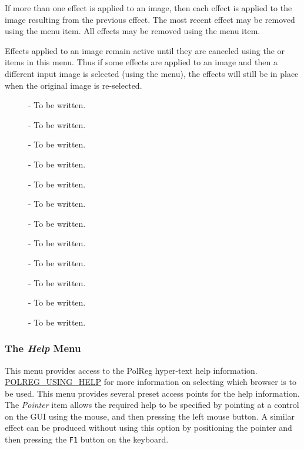 If more than one effect is applied to an image, then each effect is
applied to the image resulting from the previous effect. The most recent
effect may be removed using the 
menu item. All effects may be removed using the  menu item.

Effects applied to an image remain active until they are canceled using
the  or
 items in this menu. Thus
if some effects are applied to an image and then a different input image 
is selected (using the  menu), 
the effects will still be in place when the original image is re-selected.

\begin{description}

\item [ ] - To be written.
\item [ ] - To be written.
\item [ ] - To be written.
\item [ ] - To be written.
\item [ ] - To be written.
\item [ ] - To be written.
\item [ ] - To be written.
\item [ ] - To be written.
\item [ ] - To be written.
\item [ ] - To be written.
\item [ ] - To be written.
\item [ ] - To be written.

\end{description}

\subsubsection {The {\em Help} Menu}
This menu provides access to the PolReg hyper-text help information. 
\hyperref{Go here}{See section }{}{POLREG_USING_HELP} for more information
on selecting which browser is to be used. This menu provides several preset
access points for the help information. The {\em Pointer} item allows the 
required help to be specified by pointing at a control on the GUI using the 
mouse, and then pressing the left mouse button. A similar effect can be
produced without using this option by positioning the pointer and then
pressing the {\tt F1} button on the keyboard.

